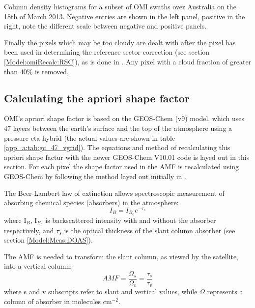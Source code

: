       {Column density histograms for a subset of OMI swaths over Australia on the 18th of March 2013.
       Negative entries are shown in the left panel, positive in the right, note the different scale between negative and positive panels.}
      {\label{Model:omiRecalc:fig_OMI_negative_hist}}
    
    Finally the pixels which may be too cloudy are dealt with after the pixel has been used in determining the reference sector correction (see section \ref{Model:omiRecalc:RSC}), as is done in \citet{Abad2015, DeSmedt2015}.
    Any pixel with a cloud fraction of greater than 40\% is removed, 
  
  \subsection{Calculating the apriori shape factor}
    \label{Model:omiRecalc:ShapeFactor}
    OMI's apriori shape factor is based on the GEOS-Chem (v9) model, which uses 47 layers between the earth's surface and the top of the atmosphere using a pressure-eta hybrid (the actual values are shown in table \ref{app_a:tab:gc_47_vgrid}).
    The equations and method of recalculating this apriori shape factur with the newer GEOS-Chem V10.01 code is layed out in this section.
    For each pixel the shape factor used in the AMF is recalculated using GEOS-Chem by following the method layed out initially in \textcite{Palmer2001}.
    
    The Beer-Lambert law of extinction allows spectroscopic measurement of absorbing chemical species (absorbers) in the atmosphere:
    \begin{equation} \label{ch_HCHO:eqn:beerlambert}
    I_B = I_{B_0} e^{-\tau_s}
    \end{equation}
    where I$_B$, I$_{B_0}$ is backscattered intensity with and without the absorber respectively, and $\tau_s$ is the optical thickness of the slant column absorber (see section \ref{Model:Meas:DOAS}).
    
    The AMF is needed to transform the slant column, as viewed by the satellite, into a vertical column:
    \begin{equation} \label{ch_HCHO:eqn:AMFratio}
    AMF = \frac{\Omega_s}{\Omega_v} = \frac{\tau_s}{\tau_v}
    \end{equation}
    where s and v subscripts refer to slant and vertical values, while $\Omega$ represents a column of absorber in molecules cm$^{-2}$.
    
